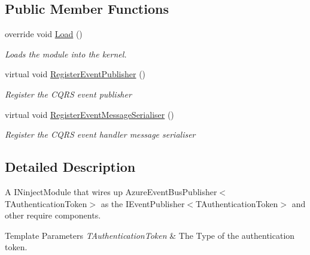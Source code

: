 \subsection*{Public Member Functions}
\begin{DoxyCompactItemize}
\item 
override void \hyperlink{classCqrs_1_1Ninject_1_1Azure_1_1ServiceBus_1_1EventBus_1_1Configuration_1_1AzureEventBusPublisherModule_a11a88bff10a41598c93ef7676b2a359f_a11a88bff10a41598c93ef7676b2a359f}{Load} ()
\begin{DoxyCompactList}\small\item\em Loads the module into the kernel. \end{DoxyCompactList}\item 
virtual void \hyperlink{classCqrs_1_1Ninject_1_1Azure_1_1ServiceBus_1_1EventBus_1_1Configuration_1_1AzureEventBusPublisherModule_a89700c46e638c185b662b20bc938486d_a89700c46e638c185b662b20bc938486d}{Register\+Event\+Publisher} ()
\begin{DoxyCompactList}\small\item\em Register the C\+Q\+RS event publisher \end{DoxyCompactList}\item 
virtual void \hyperlink{classCqrs_1_1Ninject_1_1Azure_1_1ServiceBus_1_1EventBus_1_1Configuration_1_1AzureEventBusPublisherModule_a9f583dad8324f3d06ca9cc90af34fbe4_a9f583dad8324f3d06ca9cc90af34fbe4}{Register\+Event\+Message\+Serialiser} ()
\begin{DoxyCompactList}\small\item\em Register the C\+Q\+RS event handler message serialiser \end{DoxyCompactList}\end{DoxyCompactItemize}


\subsection{Detailed Description}
A I\+Ninject\+Module that wires up Azure\+Event\+Bus\+Publisher$<$\+T\+Authentication\+Token$>$ as the I\+Event\+Publisher$<$\+T\+Authentication\+Token$>$ and other require components. 


\begin{DoxyTemplParams}{Template Parameters}
{\em T\+Authentication\+Token} & The Type of the authentication token.\\
\hline
\end{DoxyTemplParams}


